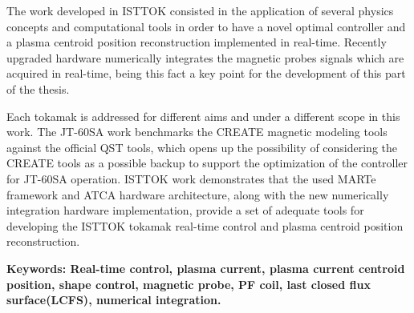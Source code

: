  The work developed in ISTTOK consisted in the application of several physics concepts and computational tools in order to have a novel optimal controller and a plasma centroid position reconstruction implemented in real-time. Recently upgraded hardware numerically integrates  the magnetic probes signals which are acquired in real-time, being this fact a key point for the development of this part of the thesis.\smallskip
 

 

Each tokamak is addressed for different aims and under a different scope in this work. The JT-60SA work benchmarks the CREATE magnetic modeling tools against the official QST tools, which opens up the possibility of considering the CREATE tools as a possible backup to support the optimization of the controller for JT-60SA operation. ISTTOK work demonstrates that the used MARTe framework and ATCA hardware architecture, along with the new numerically integration hardware implementation, provide a set of adequate tools for developing the ISTTOK tokamak real-time control and plasma centroid position reconstruction.
 


\textbf{Keywords: Real-time control, plasma current, plasma current centroid position,   shape control, magnetic probe, PF coil, last closed flux surface(LCFS), numerical integration.} 

